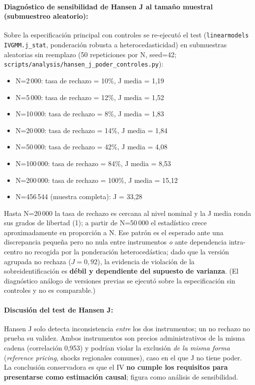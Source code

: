 \documentclass[doc, a4paper, biblatex, floatsintext, longtable, babel]{apa7}
\begin{document}
\paragraph{Diagnóstico de sensibilidad de Hansen J al tamaño muestral (submuestreo aleatorio):} Sobre la especificación principal con controles se re-ejecutó el test (\texttt{linearmodels IVGMM.j\_stat}, ponderación robusta a heterocedasticidad) en submuestras aleatorias sin reemplazo (50 repeticiones por N, seed=42; \texttt{scripts/analysis/hansen\_j\_poder\_controles.py}):
\begin{itemize}
    \item N=2\,000: tasa de rechazo = 10\%, J media = 1,19
    \item N=5\,000: tasa de rechazo = 12\%, J media = 1,52
    \item N=10\,000: tasa de rechazo = 8\%, J media = 1,83
    \item N=20\,000: tasa de rechazo = 14\%, J media = 1,84
    \item N=50\,000: tasa de rechazo = 42\%, J media = 4,08
    \item N=100\,000: tasa de rechazo = 84\%, J media = 8,53
    \item N=200\,000: tasa de rechazo = 100\%, J media = 15,12
    \item N=456\,544 (muestra completa): J = 33,28
\end{itemize}
Hasta N=20\,000 la tasa de rechazo es cercana al nivel nominal y la J media ronda sus grados de libertad (1); a partir de N=50\,000 el estadístico crece aproximadamente en proporción a N. Ese patrón es el esperado ante una discrepancia pequeña pero no nula entre instrumentos \emph{o} ante dependencia intra-centro no recogida por la ponderación heterocedástica; dado que la versión agrupada no rechaza ($J=0,92$), la evidencia de violación de la sobreidentificación es \textbf{débil y dependiente del supuesto de varianza}. (El diagnóstico análogo de versiones previas se ejecutó sobre la especificación sin controles y no es comparable.)

\paragraph{Discusi\'on del test de Hansen J:} Hansen J solo detecta inconsistencia \emph{entre} los dos instrumentos; un no rechazo no prueba su validez. Ambos instrumentos son precios administrativos de la misma cadena (correlación 0,953) y podrían violar la exclusión \emph{de la misma forma} (\textit{reference pricing}, shocks regionales comunes), caso en el que J no tiene poder. La conclusi\'on conservadora es que el IV \textbf{no cumple los requisitos para presentarse como estimaci\'on causal}; figura como análisis de sensibilidad.
\end{document}
